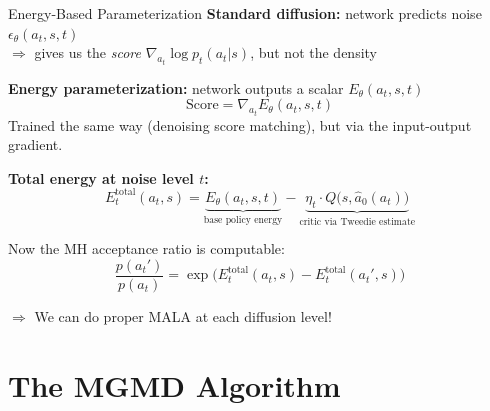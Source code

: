 \documentclass[aspectratio=169,11pt]{beamer}
\begin{document}
\begin{frame}{Energy-Based Parameterization}
\textbf{Standard diffusion:} network predicts noise $\epsilon_\theta(a_t, s, t)$ \\
$\Rightarrow$ gives us the \emph{score} $\nabla_{a_t} \log p_t(a_t|s)$, but not the density

\pause
\medskip
\textbf{Energy parameterization:} network outputs a scalar $E_\theta(a_t, s, t)$
\[
  \text{Score} = \nabla_{a_t} E_\theta(a_t, s, t)
\]
Trained the same way (denoising score matching), but via the input-output gradient.

\pause
\medskip
\textbf{Total energy at noise level $t$:}
\[
  E_t^{\text{total}}(a_t, s) = \underbrace{E_\theta(a_t, s, t)}_{\text{base policy energy}} - \underbrace{\eta_t \cdot Q\big(s, \hat{a}_0(a_t)\big)}_{\text{critic via Tweedie estimate}}
\]

\pause
\medskip
Now the MH acceptance ratio is computable:
\[
  \frac{p(a_t')}{p(a_t)} = \exp\!\Big(E_t^{\text{total}}(a_t, s) - E_t^{\text{total}}(a_t', s)\Big)
\]

\pause
\textcolor{accent}{$\Rightarrow$ We can do proper MALA at each diffusion level!}
\end{frame}

\section{The MGMD Algorithm}
\end{document}
